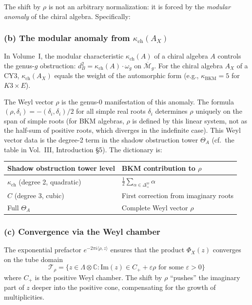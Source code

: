 \documentclass[11pt]{article}
\theoremstyle{definition}
\theoremstyle{remark}
\begin{document}
The shift by $\rho$ is not an arbitrary normalization: it is forced by the
\emph{modular anomaly} of the chiral algebra. Specifically:

\subsubsection{(b) The modular anomaly from $\kappa_{\mathrm{ch}}(A_X)$}

In Volume~I, the modular characteristic $\kappa_{\mathrm{ch}}(A)$ of a chiral algebra
$A$ controls the genus-$g$ obstruction: $d_B^2 = \kappa_{\mathrm{ch}}(A) \cdot \omega_g$
on $\overline{\mathcal{M}}_g$. For the chiral algebra $A_X$ of a CY3,
$\kappa_{\mathrm{ch}}(A_X)$ equals the weight of the automorphic form (e.g., $\kappa_{\mathrm{BKM}} = 5$
for $K3 \times E$).

The Weyl vector $\rho$ is the genus-0 manifestation of this anomaly.
The formula $(\rho, \delta_i) = -(\delta_i, \delta_i)/2$ for all simple
real roots $\delta_i$ determines $\rho$ uniquely on the span of simple
roots (for BKM algebras, $\rho$ is defined by this linear system, not
as the half-sum of positive roots, which diverges in the indefinite
case). This Weyl vector data is the degree-2
term in the shadow obstruction tower $\Theta_A$ (cf.\ the table in Vol.~III, Introduction \S5). The dictionary is:

\begin{center}
\renewcommand{\arraystretch}{1.3}
\begin{tabular}{ll}
\hline
\textbf{Shadow obstruction tower level} & \textbf{BKM contribution to $\rho$} \\
\hline
$\kappa_{\mathrm{ch}}$ (degree 2, quadratic) & $\frac{1}{2}\sum_{\alpha \in \Delta_+^{\mathrm{re}}} \alpha$ \\
$C$ (degree 3, cubic) & First correction from imaginary roots \\
Full $\Theta_A$ & Complete Weyl vector $\rho$ \\
\hline
\end{tabular}
\end{center}

\subsubsection{(c) Convergence via the Weyl chamber}

The exponential prefactor $e^{-2\pi i\langle\rho,z\rangle}$ ensures that
the product $\Phi_X(z)$ converges on the tube domain
\[
 \mathcal{T}_\rho = \{z \in \Lambda \otimes \mathbb{C} : \mathrm{Im}(z) \in C_+ + \varepsilon\rho \text{ for some } \varepsilon > 0\}
\]
where $C_+$ is the positive Weyl chamber. The shift by $\rho$ ``pushes''
the imaginary part of $z$ deeper into the positive cone, compensating for
the growth of multiplicities.
\end{document}
